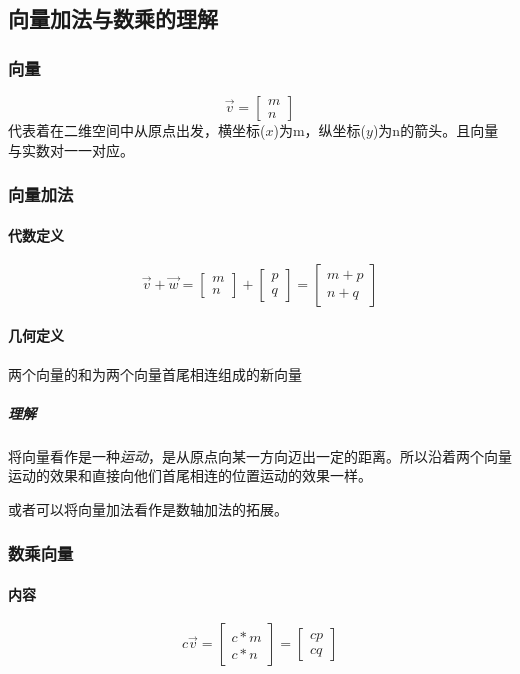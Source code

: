 \documentclass[UTF8]{ctexart}
\begin{document}
\subsection{向量加法与数乘的理解}
\subsubsection{向量}
$$\overrightarrow{v} = \begin{bmatrix}
	m \\ n
\end{bmatrix}$$
代表着在二维空间中从原点出发，横坐标($x$)为m，纵坐标($y$)为n的箭头。且向量与实数对一一对应。
\subsubsection{向量加法}
\paragraph{代数定义}
$$\overrightarrow{v} + \overrightarrow{w} = \begin{bmatrix}
	m \\ n
\end{bmatrix} + 
\begin{bmatrix}
	p \\ q
\end{bmatrix} =
\begin{bmatrix}
	m+p \\ n+q
\end{bmatrix}$$
\paragraph{几何定义}
两个向量的和为两个向量首尾相连组成的新向量
\subparagraph{理解}
将向量看作是一种\emph{运动}，是从原点向某一方向迈出一定的距离。所以沿着两个向量运动的效果和直接向他们首尾相连的位置运动的效果一样。
\par
或者可以将向量加法看作是数轴加法的拓展。
\subsubsection{数乘向量}
\paragraph{内容}
$$c\overrightarrow{v}= \begin{bmatrix}
	c*m \\ c*n
\end{bmatrix} =
\begin{bmatrix}
	cp \\ cq
\end{bmatrix}$$
\end{document}

